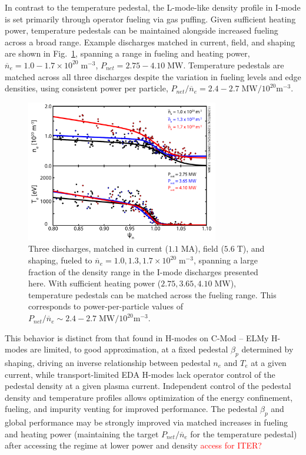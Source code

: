 \documentclass[12pt]{iopart}
\renewcommand{\note}[1]{\textcolor{red}{#1}}
\begin{document}
In contrast to the temperature pedestal, the L-mode-like density profile in I-mode is set primarily through operator fueling via gas puffing.
Given sufficient heating power, temperature pedestals can be maintained alongside increased fueling across a broad range.
Example discharges matched in current, field, and shaping are shown in Fig.~\ref{fig:fuelingprofiles}, spanning a range in fueling and heating power, $\overline{n}_e = 1.0-1.7\times10^{20} \;\mbox{m}^{-3}$, $P_{net} = 2.75-4.10\;\mbox{MW}$.  
Temperature pedestals are matched across all three discharges despite the variation in fueling levels and edge densities, using consistent power per particle, $P_{net}/\overline{n}_e = 2.4-2.7\;\mbox{MW}/10^{20}\mbox{m}^{-3}$.

\begin{figure}[ht]
 \centering
 \includegraphics[width=0.75\textwidth]{fuelingprofiles.pdf}
 \caption{Three discharges, matched in current ($1.1\;\mbox{MA}$), field ($5.6\;\mbox{T}$), and shaping, fueled to $\overline{n}_e = 1.0, 1.3, 1.7 \times 10^{20} \;\mbox{m}^{-3}$, spanning a large fraction of the density range in the I-mode discharges presented here.  With sufficient heating power ($2.75, 3.65, 4.10 \;\mbox{MW}$), temperature pedestals can be matched across the fueling range.  This corresponds to power-per-particle values of $P_{net}/\overline{n}_e \sim 2.4-2.7 \;\mbox{MW}/10^{20}\mbox{m}^{-3}$.}
 \label{fig:fuelingprofiles}
\end{figure}

This behavior is distinct from that found in H-modes on C-Mod -- ELMy H-modes are limited, to good approximation, at a fixed pedestal $\beta_p$ determined by shaping, driving an inverse relationship between pedestal $n_e$ and $T_e$ at a given current, while transport-limited EDA H-modes lack operator control of the pedestal density at a given plasma current.
Independent control of the pedestal density and temperature profiles allows optimization of the energy confinement, fueling, and impurity venting for improved performance.
The pedestal $\beta_p$ and global performance may be strongly improved via matched increases in fueling and heating power (maintaining the target $P_{net}/\overline{n}_e$ for the temperature pedestal) after accessing the regime at lower power and density \note{access for ITER?}
\end{document}
